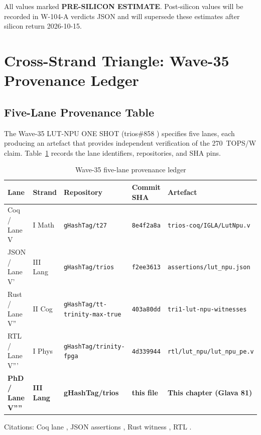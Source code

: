 \noindent All values marked \textbf{PRE-SILICON ESTIMATE}.  Post-silicon values
will be recorded in W-104-A verdicts JSON and will supersede these estimates
after silicon return 2026-10-15.

\section{Cross-Strand Triangle: Wave-35 Provenance Ledger}
\label{sec:triangle}

\subsection{Five-Lane Provenance Table}

The Wave-35 LUT-NPU ONE SHOT (trios\#858 \cite{assertions_w35_trios_859})
specifies five lanes, each producing an artefact that provides independent
verification of the 270~TOPS/W claim.  Table~\ref{tab:provenance} records
the lane identifiers, repositories, and SHA pins.

\begin{table}[ht]
\centering
\caption{Wave-35 five-lane provenance ledger}
\label{tab:provenance}
\begin{tabular}{lllll}
\hline
Lane & Strand & Repository & Commit SHA & Artefact \\
\hline
Coq / Lane V  & I Math   & \texttt{gHashTag/t27} & \texttt{8e4f2a8a} & \texttt{trios-coq/IGLA/LutNpu.v} \\
JSON / Lane V' & III Lang & \texttt{gHashTag/trios} & \texttt{f2ee3613} & \texttt{assertions/lut\_npu.json} \\
Rust / Lane V'' & II Cog & \texttt{gHashTag/tt-trinity-max-true} & \texttt{403a80dd} & \texttt{tri1-lut-npu-witnesses} \\
RTL / Lane V''' & I Phys & \texttt{gHashTag/trinity-fpga} & \texttt{4d339944} & \texttt{rtl/lut\_npu/lut\_npu\_pe.v} \\
\textbf{PhD / Lane V''''} & \textbf{III Lang} & \textbf{gHashTag/trios} & \textbf{this file} & \textbf{This chapter (Glava 81)} \\
\hline
\end{tabular}
\end{table}

\noindent Citations: Coq lane \cite{coq_lut_npu_t27_651}, JSON assertions
\cite{assertions_w35_trios_859}, Rust witness \cite{rust_witness_w104a_max_true_21},
RTL \cite{rtl_lut_npu_trinity_fpga_124}.

